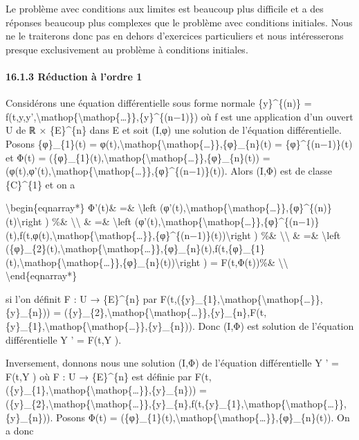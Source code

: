 \documentclass[]{article}
\begin{document}
Le problème avec conditions aux limites est beaucoup plus difficile et a
des réponses beaucoup plus complexes que le problème avec conditions
initiales. Nous ne le traiterons donc pas en dehors d'exercices
particuliers et nous intéresserons presque exclusivement au problème à
conditions initiales.

\paragraph{16.1.3 Réduction à l'ordre 1}

Considérons une équation différentielle sous forme normale
\{y\}\^{}\{(n)\} =
f(t,y,y',\textbackslash{}mathop\{\textbackslash{}mathop\{\ldots{}\}\},\{y\}\^{}\{(n−1)\})
où f est une application d'un ouvert U de ℝ × \{E\}\^{}\{n\} dans E et
soit (I,φ) une solution de l'équation différentielle. Posons
\{φ\}\_\{1\}(t) =
φ(t),\textbackslash{}mathop\{\textbackslash{}mathop\{\ldots{}\}\},\{φ\}\_\{n\}(t)
= \{φ\}\^{}\{(n−1)\}(t) et Φ(t) =
(\{φ\}\_\{1\}(t),\textbackslash{}mathop\{\textbackslash{}mathop\{\ldots{}\}\},\{φ\}\_\{n\}(t))
=
(φ(t),φ'(t),\textbackslash{}mathop\{\textbackslash{}mathop\{\ldots{}\}\},\{φ\}\^{}\{(n−1)\}(t)).
Alors (I,Φ) est de classe \{C\}\^{}\{1\} et on a

\textbackslash{}begin\{eqnarray*\} Φ'(t)\& =\& \textbackslash{}left
(φ'(t),\textbackslash{}mathop\{\textbackslash{}mathop\{\ldots{}\}\},\{φ\}\^{}\{(n)\}(t)\textbackslash{}right
) \%\& \textbackslash{}\textbackslash{} \& =\& \textbackslash{}left
(φ'(t),\textbackslash{}mathop\{\textbackslash{}mathop\{\ldots{}\}\},\{φ\}\^{}\{(n−1)\}(t),f(t,φ(t),\textbackslash{}mathop\{\textbackslash{}mathop\{\ldots{}\}\},\{φ\}\^{}\{(n−1)\}(t))\textbackslash{}right
) \%\& \textbackslash{}\textbackslash{} \& =\& \textbackslash{}left
(\{φ\}\_\{2\}(t),\textbackslash{}mathop\{\textbackslash{}mathop\{\ldots{}\}\},\{φ\}\_\{n\}(t),f(t,\{φ\}\_\{1\}(t),\textbackslash{}mathop\{\textbackslash{}mathop\{\ldots{}\}\},\{φ\}\_\{n\}(t))\textbackslash{}right
) = F(t,Φ(t))\%\& \textbackslash{}\textbackslash{}
\textbackslash{}end\{eqnarray*\}

si l'on définit F : U → \{E\}\^{}\{n\} par
F(t,(\{y\}\_\{1\},\textbackslash{}mathop\{\textbackslash{}mathop\{\ldots{}\}\},\{y\}\_\{n\}))
=
(\{y\}\_\{2\},\textbackslash{}mathop\{\textbackslash{}mathop\{\ldots{}\}\},\{y\}\_\{n\},F(t,\{y\}\_\{1\},\textbackslash{}mathop\{\textbackslash{}mathop\{\ldots{}\}\},\{y\}\_\{n\})).
Donc (I,Φ) est solution de l'équation différentielle Y ' = F(t,Y ).

Inversement, donnons nous une solution (I,Φ) de l'équation
différentielle Y ' = F(t,Y ) où F : U → \{E\}\^{}\{n\} est définie par
F(t,(\{y\}\_\{1\},\textbackslash{}mathop\{\textbackslash{}mathop\{\ldots{}\}\},\{y\}\_\{n\}))
=
(\{y\}\_\{2\},\textbackslash{}mathop\{\textbackslash{}mathop\{\ldots{}\}\},\{y\}\_\{n\},f(t,\{y\}\_\{1\},\textbackslash{}mathop\{\textbackslash{}mathop\{\ldots{}\}\},\{y\}\_\{n\})).
Posons Φ(t) =
(\{φ\}\_\{1\}(t),\textbackslash{}mathop\{\textbackslash{}mathop\{\ldots{}\}\},\{φ\}\_\{n\}(t)).
On a donc
\end{document}
